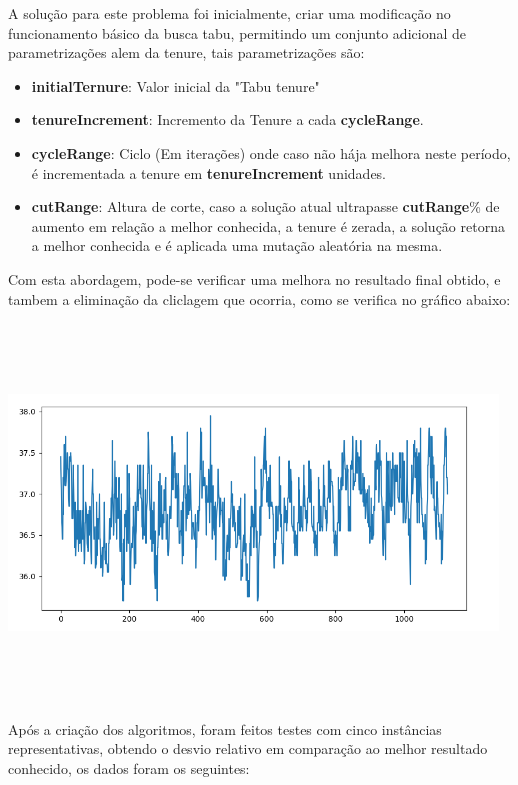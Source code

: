 \documentclass[a4paper,11pt]{article}
\begin{document}
A solu\c c\~ao para este problema foi inicialmente, criar uma modifica\c c\~ao no funcionamento b\'asico da busca tabu, permitindo um conjunto adicional de parametriza\c c\~oes alem da tenure, tais parametriza\c c\~oes s\~ao:

\begin{itemize}
   \item \textbf{initialTernure}: Valor inicial da "Tabu tenure"
   \item \textbf{tenureIncrement}: Incremento da Tenure a cada \textbf{cycleRange}.
   \item \textbf{cycleRange}: Ciclo (Em itera\c c\~oes) onde caso n\~ao h\'aja melhora neste per\'iodo, \'e incrementada a tenure em \textbf{tenureIncrement} unidades.
   \item \textbf{cutRange}: Altura de corte, caso a solu\c c\~ao atual ultrapasse \textbf{cutRange}\% de aumento em rela\c c\~ao a melhor conhecida, a tenure \'e zerada, a solu\c c\~ao retorna a melhor conhecida e \'e aplicada uma muta\c c\~ao aleat\'oria na mesma.
\end{itemize}

Com esta abordagem, pode-se verificar uma melhora no resultado final obtido, e tambem a elimina\c c\~ao da cliclagem que ocorria, como se verifica no gr\'afico abaixo:

\includegraphics[width=13cm, height=10cm]{graph2.png}

Ap\'os a cria\c c\~ao dos algoritmos, foram feitos testes com cinco inst\^ancias representativas, obtendo o desvio relativo em compara\c c\~ao ao melhor resultado conhecido, os dados foram os seguintes:
\end{document}
